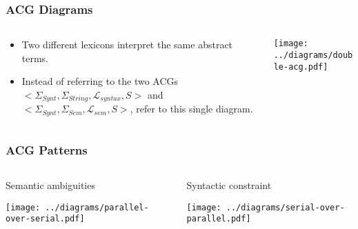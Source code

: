\documentclass{beamer}
\begin{document}
\begin{frame}
  \frametitle{ACG Diagrams}

  \begin{columns}[c]
    \begin{column}{0.5\textwidth}
      \begin{itemize}
      \item Two different lexicons interpret the same abstract terms.
      \item Instead of referring to the two ACGs $\mathopen{<}
        \Sigma_{Synt}, \Sigma_{String}, \mathcal{L}_{syntax}, S
        \mathclose{>}$ and $\mathopen{<} \Sigma_{Synt}, \Sigma_{Sem},
        \mathcal{L}_{sem}, S \mathclose{>}$, refer to this single
        diagram.
      \end{itemize}
    \end{column}
    \begin{column}{0.5\textwidth}
      \texttt{[image: ../diagrams/double-acg.pdf]}
    \end{column}
  \end{columns}
\end{frame}


\begin{frame}
  \frametitle{ACG Patterns}

  \begin{columns}[c]
    \begin{column}{0.5\textwidth}
      \begin{block}{Semantic ambiguities}
        \vspace{2 mm}
        \begin{center}
          \texttt{[image: ../diagrams/parallel-over-serial.pdf]}
        \end{center}
      \end{block}
    \end{column}
    \begin{column}{0.5\textwidth}
      \begin{block}{Syntactic constraint}
        \vspace{2 mm}
        \begin{center}
          \texttt{[image: ../diagrams/serial-over-parallel.pdf]}
        \end{center}
      \end{block}
    \end{column}
  \end{columns}
\end{frame}
\end{document}
